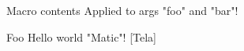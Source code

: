 \documentclass{article}
\newcommand{\mymacro}{Macro contents}
\newcommand{\macroWithArgs}[2]{Applied to args #1  and #2!}
\newcommand{\family}[3][Matic]{#1 #2 #3}
\newcommand{\helloworld}[1]["Matic"]{Hello world #1!}
\begin{document}
\mymacro{}
\macroWithArgs{"foo"}{"bar"}

\family[Foo]
\helloworld[Tela]
\end{document}
